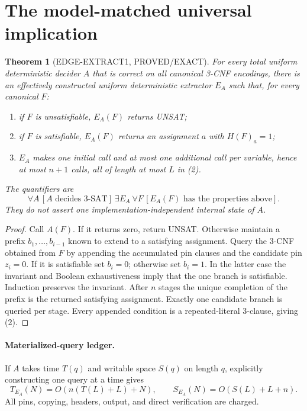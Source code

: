 \documentclass[11pt]{article}
\newtheorem{theorem}{Theorem}
\begin{document}
\section{The model-matched universal implication}
\begin{theorem}[EDGE-EXTRACT1, PROVED/EXACT]
For every total uniform deterministic decider $A$ that is correct on all
canonical 3-CNF encodings, there is an effectively constructed uniform
deterministic extractor $E_A$ such that, for every canonical $F$:
\begin{enumerate}
\item if $F$ is unsatisfiable, $E_A(F)$ returns UNSAT;
\item if $F$ is satisfiable, $E_A(F)$ returns an assignment $a$ with
      $H(F)_a=1$;
\item $E_A$ makes one initial call and at most one additional call per
      variable, hence at most $n+1$ calls, all of length at most $L$ in (2).
\end{enumerate}
The quantifiers are
\[
 \forall A\,[A\text{ decides 3-SAT}]
 \ \exists E_A\ \forall F\,[E_A(F)\text{ has the properties above}].
\]
They do not assert one implementation-independent internal state of $A$.
\end{theorem}

\begin{proof}
Call $A(F)$.  If it returns zero, return UNSAT.  Otherwise maintain a prefix
$b_1,\ldots,b_{i-1}$ known to extend to a satisfying assignment.  Query the
3-CNF obtained from $F$ by appending the accumulated pin clauses and the
candidate pin $z_i=0$.  If it is satisfiable set $b_i=0$; otherwise set
$b_i=1$.  In the latter case the invariant and Boolean exhaustiveness imply
that the one branch is satisfiable.  Induction preserves the invariant.
After $n$ stages the unique completion of the prefix is the returned
satisfying assignment.  Exactly one candidate branch is queried per stage.
Every appended condition is a repeated-literal 3-clause, giving (2).
\end{proof}

\paragraph{Materialized-query ledger.}
If $A$ takes time $T(q)$ and writable space $S(q)$ on length $q$, explicitly
constructing one query at a time gives
\[
 T_{E_A}(N)=O\!\left(n(T(L)+L)+N\right),\qquad
 S_{E_A}(N)=O\!\left(S(L)+L+n\right).                      \tag{3}
\]
All pins, copying, headers, output, and direct verification are charged.
\end{document}
